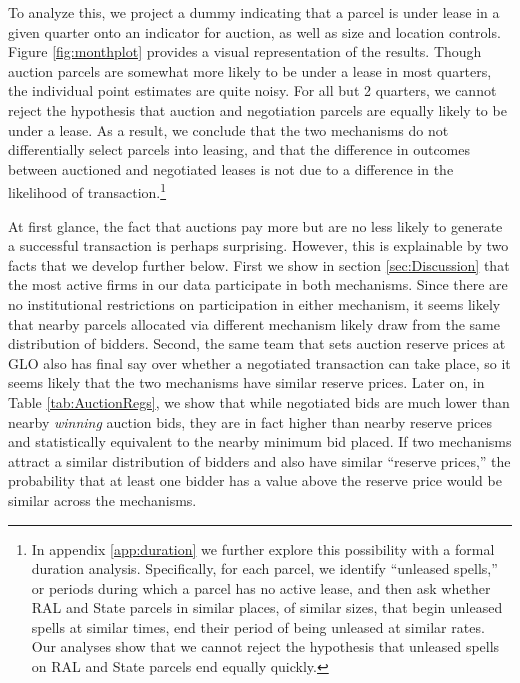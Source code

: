 To analyze this, we project a dummy indicating that a parcel is under lease in a given quarter onto an indicator for auction, as well as size and location controls. Figure \ref{fig:monthplot} provides a visual representation of the results. Though auction parcels are somewhat more likely to be under a lease in most quarters, the individual point estimates are quite noisy.  For all but 2 quarters, we cannot reject the hypothesis that auction and negotiation parcels are equally likely to be under a lease. As a result, we conclude that the two mechanisms do not differentially select parcels into leasing, and that the difference in outcomes between auctioned and negotiated leases is not due to a difference in the likelihood of transaction.\footnote{In appendix \ref{app:duration} we further explore this possibility with a formal duration analysis.  Specifically, for each parcel, we identify ``unleased spells,'' or periods during which a parcel has no active lease, and then ask whether RAL and State parcels in similar places, of similar sizes, that begin unleased spells at similar times, end their period of being unleased at similar rates.   Our analyses show that we cannot reject the hypothesis that unleased spells on RAL and State parcels end equally quickly.}

At first glance, the fact that auctions pay more but are no less likely to generate a successful transaction is perhaps surprising. However, this is explainable by two facts that we develop further below. First we show in section \ref{sec:Discussion} that the most active firms in our data participate in both mechanisms. Since there are no institutional restrictions on participation in either mechanism, it seems likely that nearby parcels allocated via different mechanism likely draw from the same distribution of bidders. Second, the same team that sets auction reserve prices at GLO also has final say over whether a negotiated transaction can take place, so it seems likely that the two mechanisms have similar reserve prices. Later on, in Table \ref{tab:AuctionRegs}, we show that while negotiated bids are much lower than nearby \emph{winning} auction bids, they are in fact higher than nearby reserve prices and statistically equivalent to the nearby minimum bid placed. If two mechanisms attract a similar distribution of bidders and also have similar ``reserve prices,'' the probability that at least one bidder has a value above the reserve price would be similar across the mechanisms. 

